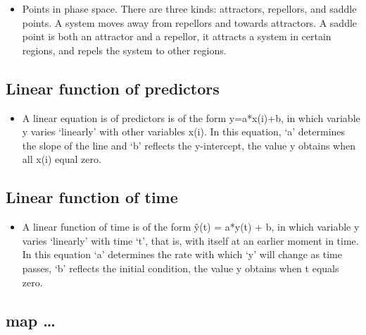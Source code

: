 \documentclass[12pt,]{book}
\providecommand{\tightlist}{%
  \setlength{\itemsep}{0pt}\setlength{\parskip}{0pt}}
\begin{document}
\begin{itemize}
\tightlist
\item
  Points in phase space. There are three kinds: attractors, repellors, and saddle points. A system moves away from repellors and towards attractors. A saddle point is both an attractor and a repellor, it attracts a system in certain regions, and repels the system to other regions.
\end{itemize}

\hypertarget{Line46}{%
\subsection*{\texorpdfstring{\textbf{Linear function of predictors}}{Linear function of predictors}}\label{Line46}}

\begin{itemize}
\tightlist
\item
  A linear equation is of predictors is of the form y=a*x(i)+b, in which variable y varies `linearly' with other variables x(i). In this equation, `a' determines the slope of the line and `b' reflects the y-intercept, the value y obtains when all x(i) equal zero.
\end{itemize}

\hypertarget{Line47}{%
\subsection*{\texorpdfstring{\textbf{Linear function of time}}{Linear function of time}}\label{Line47}}

\begin{itemize}
\tightlist
\item
  A linear function of time is of the form ŷ(t) = a*y(t) + b, in which variable y varies `linearly' with time `t', that is, with itself at an earlier moment in time. In this equation `a' determines the rate with which `y' will change as time passes, `b' reflects the initial condition, the value y obtains when t equals zero.
\end{itemize}

\hypertarget{map48}{%
\subsection*{\texorpdfstring{\textbf{map \ldots{}}}{map \ldots{}}}\label{map48}}
\end{document}
